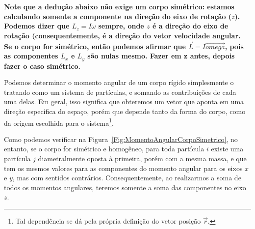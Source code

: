 \textbf{Note que a dedução abaixo não exige um corpo simétrico: estamos calculando somente a componente na direção do eixo de rotação ($z$). Podemos dizer que $L_z = I\omega$ sempre, onde $z$ é a direção do eixo de rotação (consequentemente, é a direção do vetor velocidade angular. Se o corpo for simétrico, então podemos afirmar que $\vec{L} = I\vec{omega}$, pois as componentes $L_x$ e $L_y$ são nulas mesmo. Fazer em z antes, depois fazer o caso simétrico.}

Podemos determinar o momento angular de um corpo rígido simplesmente o tratando como um sistema de partículas, e somando as contribuições de cada uma delas. Em geral, isso significa que obteremos um vetor que aponta em uma direção específica do espaço, porém que depende tanto da forma do corpo, como da origem escolhida para o sistema\footnote{Tal dependência se dá pela própria definição do vetor posição $\vec{r}$.}.

Como podemos verificar na Figura~\ref{Fig:MomentoAngularCorpoSimetrico}, no entanto, se o corpo for simétrico e homogêneo, para toda partícula $i$ existe uma partícula $j$ diametralmente oposta à primeira, porém com a mesma massa, e que tem os mesmos valores para as componentes do momento angular para os eixos $x$ e $y$, mas com sentidos contrários. Consequentemente, ao realizarmos a soma de todos os momentos angulares, teremos somente a soma das componentes no eixo $z$.

